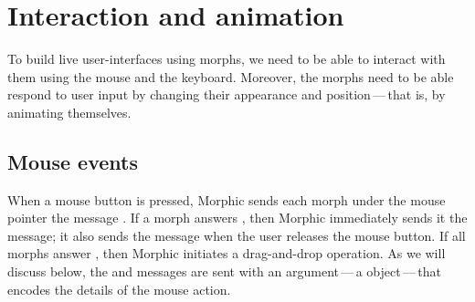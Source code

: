 \documentclass[a4paper,10pt,twoside]{book}
\begin{document}





\section{Interaction and animation}

To build live user-interfaces using morphs, we need to be able to interact with them using the mouse and the keyboard.
Moreover, the morphs need to be able respond to user input by changing their appearance and position\,---\,that is, by animating themselves.


\subsection{Mouse events}

When a mouse button is pressed, Morphic sends each morph under the mouse pointer the message . If a morph answers , then Morphic immediately sends it the  message; it also sends the  message when the user releases the mouse button.
If all morphs answer , then Morphic initiates a drag-and-drop operation.
As we will discuss below, the  and  messages are sent with an argument\,---\,a  object\,---\,that encodes the details of the mouse action.
\end{document}

